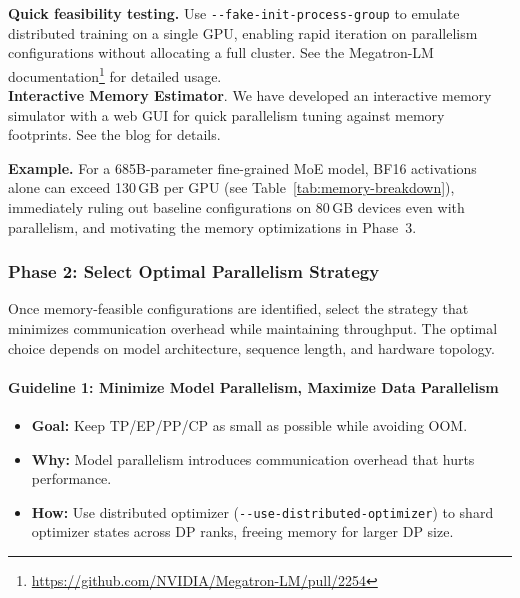\documentclass[10pt,logo,copyright]{nvidiatechreport}
\begin{document}
\begin{notebox}
\textbf{Quick feasibility testing.} Use \texttt{-{}-fake-init-process-group} to emulate distributed training on a single GPU, enabling rapid iteration on parallelism configurations without allocating a full cluster. See the Megatron-LM documentation\footnote{\url{https://github.com/NVIDIA/Megatron-LM/pull/2254}} for detailed usage.\\
\textbf{Interactive Memory Estimator}. We have developed an interactive memory simulator with a web GUI for quick parallelism tuning against memory footprints. See the blog\cite{nvidia_memory_estimator_blog} for details.

\end{notebox}

\noindent\textbf{Example.} For a 685B-parameter fine-grained MoE model, BF16 activations alone can exceed 130\,GB per GPU (see Table~\ref{tab:memory-breakdown}), immediately ruling out baseline configurations on 80\,GB devices even with parallelism, and motivating the memory optimizations in Phase~3.

\subsubsection{Phase 2: Select Optimal Parallelism Strategy}

Once memory-feasible configurations are identified, select the strategy that minimizes communication overhead while maintaining throughput. The optimal choice depends on model architecture, sequence length, and hardware topology.

\paragraph*{Guideline 1: Minimize Model Parallelism, Maximize Data Parallelism}
\begin{itemize}
    \item \textbf{Goal:} Keep TP/EP/PP/CP as small as possible while avoiding OOM.
    \item \textbf{Why:} Model parallelism introduces communication overhead that hurts performance.
    \item \textbf{How:} Use distributed optimizer (\texttt{-{}-use-distributed-optimizer}) to shard optimizer states across DP ranks, freeing memory for larger DP size.
\end{itemize}
\end{document}
